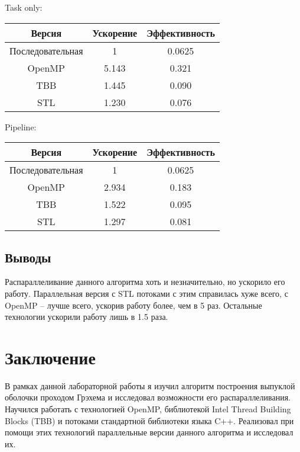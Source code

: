 \documentclass[a4paper,12pt]{article}
\begin{document}
\smallskip
Task only:

\begin{center}
    \begin{tabular}{ |c|c|c| }
        \hline
        Версия & Ускорение & Эффективность \\
        \hline
        Последовательная & 1 & 0.0625 \\
        OpenMP & 5.143 & 0.321 \\
        TBB & 1.445 & 0.090 \\
        STL & 1.230 & 0.076 \\
        \hline
    \end{tabular}
\end{center}

Pipeline:

\begin{center}
    \begin{tabular}{ |c|c|c| }
        \hline
        Версия & Ускорение & Эффективность \\
        \hline
        Последовательная & 1 & 0.0625 \\
        OpenMP & 2.934 & 0.183 \\
        TBB & 1.522 & 0.095 \\
        STL & 1.297 & 0.081 \\
        \hline
    \end{tabular}
\end{center}

\subsection{Выводы}

Распараллеливание данного алгоритма хоть и незначительно, но ускорило его работу. 
Параллельная версия с STL потоками с этим справилась хуже всего, с OpenMP -- лучше всего, ускорив работу более, чем в 5 раз. 
Остальные технологии ускорили работу лишь в 1.5 раза. 
\newpage
\section*{Заключение}

В рамках данной лабораторной работы я изучил алгоритм построения выпуклой оболочки 
проходом Грэхема и исследовал возможности его распараллеливания. Научился работать с технологией OpenMP, библиотекой Intel Thread Building Blocks (TBB) и потоками стандартной библиотеки языка C++.
Реализовал при помощи этих технологий параллельные версии данного алгоритма и исследовал их.
\end{document}
